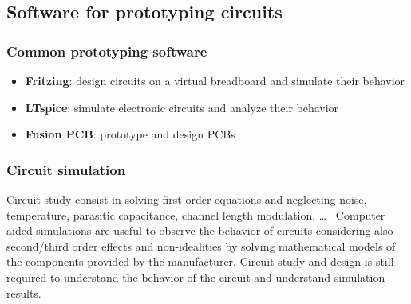 \subsection{Software for prototyping circuits}
\subsubsection*{Common prototyping software}
\begin{itemize}
	\item \textbf{Fritzing}: design circuits on a virtual breadboard and simulate their behavior
	\item \textbf{LTspice}: simulate electronic circuits and analyze their behavior
	\item \textbf{Fusion PCB}: prototype and design PCBs
\end{itemize}

\subsubsection*{Circuit simulation}
Circuit study consist in solving first order equations and neglecting noise, temperature, parasitic capacitance,
channel length modulation, \dots ~ Computer aided simulations are useful to observe the behavior of circuits
considering also second/third order effects and non-idealities by solving mathematical models of the components provided
by the manufacturer. Circuit study and design is still required to understand the behavior of the circuit and understand
simulation results.
